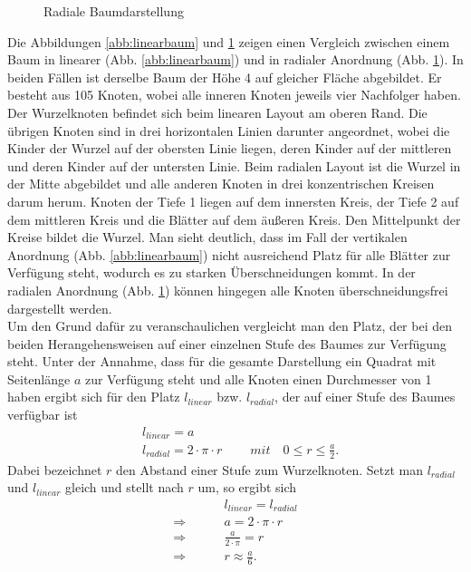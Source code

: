 \begin{figure}
\begin{minipage}{.5\textwidth}
		\caption{Radiale Baumdarstellung}
		\label{abb:radialbaum}
	\end{minipage}
\end{figure}
Die Abbildungen \ref{abb:linearbaum} und \ref{abb:radialbaum} zeigen einen Vergleich zwischen einem Baum in linearer (Abb. \ref{abb:linearbaum}) und in radialer Anordnung (Abb. \ref{abb:radialbaum}). In beiden Fällen ist derselbe Baum der Höhe 4 auf gleicher Fläche abgebildet. Er besteht aus 105 Knoten, wobei alle inneren Knoten jeweils vier Nachfolger haben. Der Wurzelknoten befindet sich beim linearen Layout am oberen Rand. Die übrigen Knoten sind in drei horizontalen Linien darunter angeordnet, wobei die Kinder der Wurzel auf der obersten Linie liegen, deren Kinder auf der mittleren und deren Kinder auf der untersten Linie. Beim radialen Layout ist die Wurzel in der Mitte abgebildet und alle anderen Knoten in drei konzentrischen Kreisen darum herum. Knoten der Tiefe 1 liegen auf dem innersten Kreis, der Tiefe 2 auf dem mittleren Kreis und die Blätter auf dem äußeren Kreis. Den Mittelpunkt der Kreise bildet die Wurzel. Man sieht deutlich, dass im Fall der vertikalen Anordnung (Abb. \ref{abb:linearbaum}) nicht ausreichend Platz für alle Blätter zur Verfügung steht, wodurch es zu starken Überschneidungen kommt. In der radialen Anordnung (Abb. \ref{abb:radialbaum}) können hingegen alle Knoten überschneidungsfrei dargestellt werden.\\
Um den Grund dafür zu veranschaulichen vergleicht man den Platz, der bei den beiden Herangehensweisen auf einer einzelnen Stufe des Baumes zur Verfügung steht. Unter der Annahme, dass für die gesamte Darstellung ein Quadrat mit Seitenlänge $a$ zur Verfügung steht und alle Knoten einen Durchmesser von 1 haben ergibt sich für den Platz $l_{linear}$ bzw. $l_{radial}$, der auf einer Stufe des Baumes verfügbar ist 
\begin{align*}
&l_{linear} = a\\
&l_{radial} = 2 \cdot \pi \cdot r\mspace{40mu} mit\quad 0\leq r \leq \frac{a}{2} .
\end{align*}
Dabei bezeichnet $r$ den Abstand einer Stufe zum Wurzelknoten. Setzt man $l_{radial}$ und $l_{linear}$ gleich und stellt nach $r$ um, so ergibt sich
\begin{align*}
&l_{linear} = l_{radial}\\
\Rightarrow \mspace{40mu} &a = 2 \cdot \pi \cdot r\\
\Rightarrow \mspace{40mu} &\frac{a}{2 \cdot \pi} = r\\
\Rightarrow \mspace{40mu} &r \approx \frac{a}{6}.
\end{align*}
